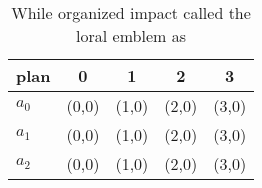 \documentclass[a4paper]{article}
\begin{document}
\begin{table}
\begin{adjustbox}{width=0.6\columnwidth}
\begin{tabular}{|l|l|l|l|l|}
\hline
\textbf{plan} & \multicolumn{1}{c|}{\textbf{0}} & \multicolumn{1}{c|}{\textbf{1}} & \multicolumn{1}{c|}{\textbf{2}} & \multicolumn{1}{c|}{\textbf{3}} \\ \hline
\textbf{$a_0$}  & (0,0) & (1,0) & (2,0) & (3,0) \\ \hline
\textbf{$a_1$}  & (0,0) & (1,0) & (2,0) & (3,0) \\ \hline
\textbf{$a_2$}  & (0,0) & (1,0) & (2,0) & (3,0) \\ \hline
\end{tabular}
\end{adjustbox}
\caption{While organized impact called the loral emblem as
}
\end{table}
\end{document}
